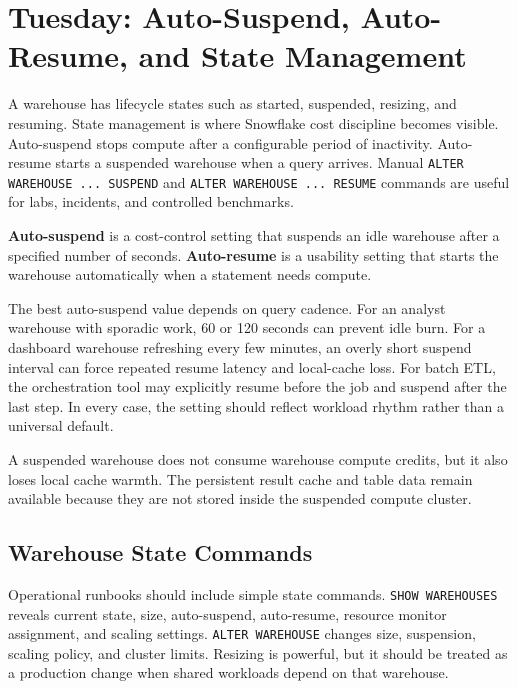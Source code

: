 \section{Tuesday: Auto-Suspend, Auto-Resume, and State Management}
A warehouse has lifecycle states such as started, suspended, resizing, and resuming. State management is where Snowflake cost discipline becomes visible. Auto-suspend stops compute after a configurable period of inactivity. Auto-resume starts a suspended warehouse when a query arrives. Manual \texttt{ALTER WAREHOUSE ... SUSPEND} and \texttt{ALTER WAREHOUSE ... RESUME} commands are useful for labs, incidents, and controlled benchmarks.

\begin{definitionbox}
\textbf{Auto-suspend} is a cost-control setting that suspends an idle warehouse after a specified number of seconds. \textbf{Auto-resume} is a usability setting that starts the warehouse automatically when a statement needs compute.
\end{definitionbox}

The best auto-suspend value depends on query cadence. For an analyst warehouse with sporadic work, 60 or 120 seconds can prevent idle burn. For a dashboard warehouse refreshing every few minutes, an overly short suspend interval can force repeated resume latency and local-cache loss. For batch ETL, the orchestration tool may explicitly resume before the job and suspend after the last step. In every case, the setting should reflect workload rhythm rather than a universal default.

\begin{notebox}
A suspended warehouse does not consume warehouse compute credits, but it also loses local cache warmth. The persistent result cache and table data remain available because they are not stored inside the suspended compute cluster.
\end{notebox}

\subsection{Warehouse State Commands}
Operational runbooks should include simple state commands. \texttt{SHOW WAREHOUSES} reveals current state, size, auto-suspend, auto-resume, resource monitor assignment, and scaling settings. \texttt{ALTER WAREHOUSE} changes size, suspension, scaling policy, and cluster limits. Resizing is powerful, but it should be treated as a production change when shared workloads depend on that warehouse.

